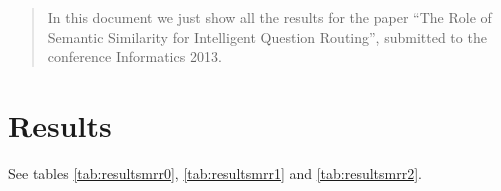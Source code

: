 \documentclass[conference]{IEEEtran}
\begin{document}




\maketitle


\begin{abstract}
In this document we just show all the results for the paper ``The Role of Semantic Similarity for Intelligent Question Routing'', submitted to the conference Informatics 2013.
\end{abstract}





%
\IEEEpeerreviewmaketitle



\section{Results}
See tables \ref{tab:resultsmrr0}, \ref{tab:resultsmrr1} and \ref{tab:resultsmrr2}.
\end{document}
